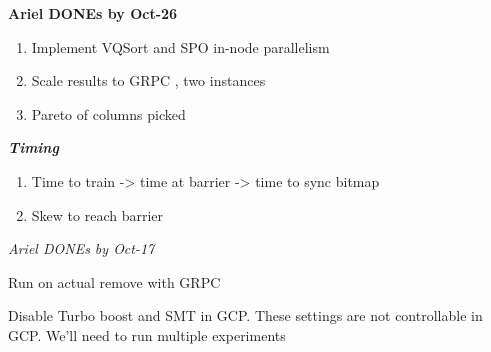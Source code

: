 \documentclass[sigconf,screen]{acmart}
\newcommand{\done}{\rlap{$\square$}{\raisebox{2pt}{\large\hspace{1pt}\checkmark}}\hspace{-2.5pt}}
\begin{document}



\textbf{Ariel DONEs by Oct-26}

\begin{enumerate}
    \item[\done] Implement VQSort and SPO in-node parallelism
    \item[\done] Scale results to GRPC , two instances
    \item[\done] Pareto of columns picked
\end{enumerate}

\textbf{\textit{Timing}}
\begin{enumerate}
    \item[\done] Time to train -> time at barrier -> time to sync bitmap
    \item[\done] Skew to reach barrier
\end{enumerate}

\textit{Ariel DONEs by Oct-17}
\begin{todolist}
    \item[\done] Run on actual remove with GRPC
    \item[\done] Disable Turbo boost and SMT in GCP. These settings are not controllable in GCP. We'll need to run multiple experiments
\end{todolist}
\end{document}
